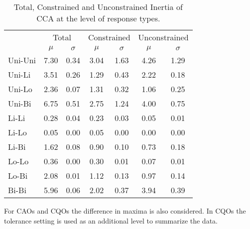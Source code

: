 		\begin{table*}[h!]
			
			\small
			\centering
			\caption{Total, Constrained and Unconstrained Inertia of CCA at the level of response types.}
			
			
			\begin{tabular}{@{}lcccccc@{}}
				
			
				\toprule
				& \multicolumn{2}{c}{Total} & \multicolumn{2}{c}{Constrained} & \multicolumn{2}{c}{Unconstrained}\\\cmidrule(l){2-3} \cmidrule(l){4-5} \cmidrule(l){6-7}
				& $\mu$ & $\sigma$ & $\mu$ & $\sigma$ & $\mu$ & $\sigma$\\
				\hline
				Uni-Uni & 7.30 & 0.34 & 3.04 & 1.63 & 4.26   & 1.29 \\
				Uni-Li  & 3.51 & 0.26 & 1.29 & 0.43 & 2.22   & 0.18 \\
				Uni-Lo  & 2.36 & 0.07 & 1.31 & 0.32 & 1.06   & 0.25 \\
				Uni-Bi  & 6.75 & 0.51 & 2.75 & 1.24 & 4.00   & 0.75 \\
				Li-Li   & 0.28 & 0.04 & 0.23 & 0.03 & 0.05   & 0.01 \\
				Li-Lo   & 0.05 & 0.00 & 0.05 & 0.00 & 0.00   & 0.00 \\
				Li-Bi   & 1.62 & 0.08 & 0.90 & 0.10 & 0.73   & 0.18 \\
				Lo-Lo   & 0.36 & 0.00 & 0.30 & 0.01 & 0.07   & 0.01 \\
				Lo-Bi   & 2.08 & 0.01 & 1.12 & 0.13 & 0.97   & 0.14 \\
				Bi-Bi   & 5.96 & 0.06 & 2.02 & 0.37 & 3.94   & 0.39	\\
				
				\toprule
				
			\end{tabular}
			
			\label{tab:smcca6}
		
		\end{table*}
		
		\vspace{10em}
		
		
	For CAOs and CQOs the difference in maxima is also considered. 
	In CQOs the tolerance setting is used as an additional level to summarize the data. 
			
